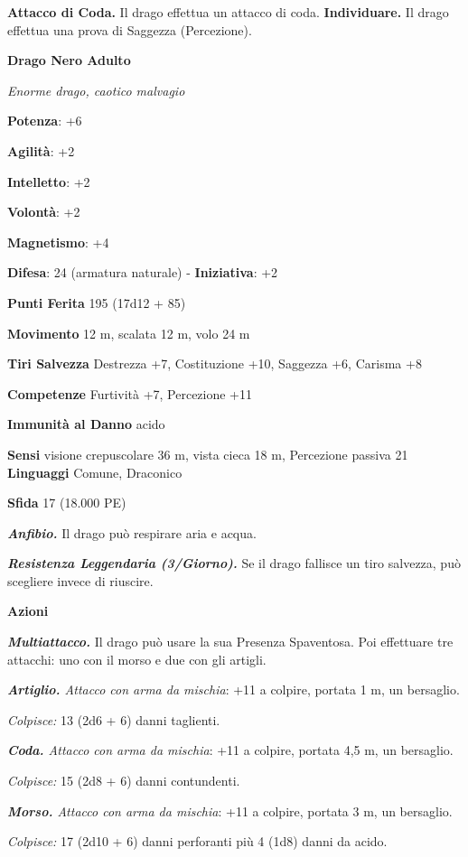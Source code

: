 \begin{multicols}{2}
\textbf{Attacco di Coda.} Il drago effettua un attacco di coda.
\textbf{Individuare.} Il drago effettua una prova di Saggezza
(Percezione).



\textbf{Drago Nero Adulto}

\emph{Enorme drago, caotico malvagio}

\textbf{Potenza}: +6

\textbf{Agilità}: +2

\textbf{Intelletto}: +2

\textbf{Volontà}: +2

\textbf{Magnetismo}: +4

\textbf{Difesa}: 24 (armatura naturale) - \textbf{Iniziativa}: +2

\textbf{Punti Ferita} 195 (17d12 + 85)

\textbf{Movimento} 12 m, scalata 12 m, volo 24 m

\textbf{Tiri Salvezza} Destrezza +7, Costituzione +10, Saggezza +6,
Carisma +8

\textbf{Competenze} Furtività +7, Percezione +11

\textbf{Immunità al Danno} acido

\textbf{Sensi} visione crepuscolare 36 m, vista cieca 18 m, Percezione passiva
21 \textbf{Linguaggi} Comune, Draconico

\textbf{Sfida} 17 (18.000 PE)\smallskip

\emph{\textbf{Anfibio.}} Il drago può respirare aria e acqua.

\emph{\textbf{Resistenza Leggendaria (3/Giorno).}} Se il drago fallisce
un tiro salvezza, può scegliere invece di riuscire.

\smallskip\textbf{Azioni}

\emph{\textbf{Multiattacco.}} Il drago può usare la sua Presenza
Spaventosa. Poi effettuare tre attacchi: uno con il morso e due con gli
artigli.

\emph{\textbf{Artiglio.} Attacco con arma da mischia}: +11 a colpire,
portata 1 m, un bersaglio.

\emph{Colpisce:} 13 (2d6 + 6) danni taglienti.

\emph{\textbf{Coda.} Attacco con arma da mischia}: +11 a colpire,
portata 4,5 m, un bersaglio.

\emph{Colpisce:} 15 (2d8 + 6) danni contundenti.

\emph{\textbf{Morso.} Attacco con arma da mischia}: +11 a colpire,
portata 3 m, un bersaglio.

\emph{Colpisce:} 17 (2d10 + 6) danni perforanti più 4 (1d8) danni da
acido.


\end{multicols}
